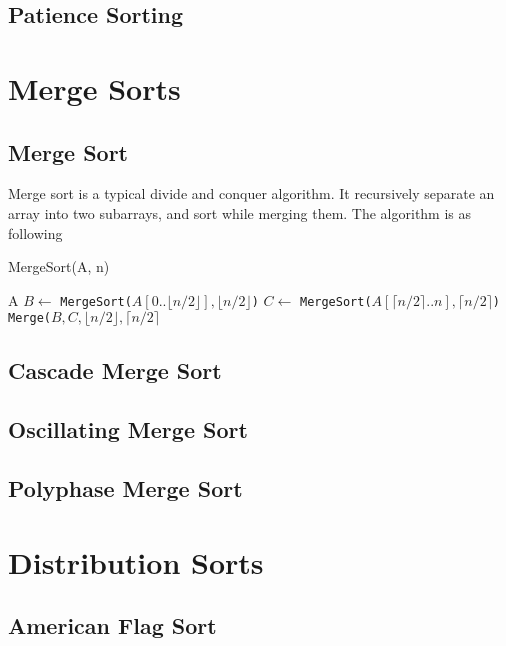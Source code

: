 				\subsection{Patience Sorting}

			\section{Merge Sorts}
				\subsection{Merge Sort}
					Merge sort is a typical divide and conquer algorithm. It recursively separate an array into two subarrays, and sort while merging them. The algorithm is as following

					\begin{algorithm}[h]
						\caption{MergeSort(A, n)}
						\begin{algorithmic}[1]
								\Return A
							\Else
								\State $B \gets$ \texttt{MergeSort($A[0 .. \lfloor n/2 \rfloor], \lfloor n/2 \rfloor$)}
								\State $C \gets$ \texttt{MergeSort($A[\lceil n/2 \rceil .. n], \lceil n/2 \rceil$)}
							\EndIf
							\Return \texttt{Merge($B, C, \lfloor n/2 \rfloor, \lceil n/2 \rceil$}
						\end{algorithmic}
					\end{algorithm}

				\subsection{Cascade Merge Sort}

				\subsection{Oscillating Merge Sort}

				\subsection{Polyphase Merge Sort}

			\section{Distribution Sorts}
				\subsection{American Flag Sort}

